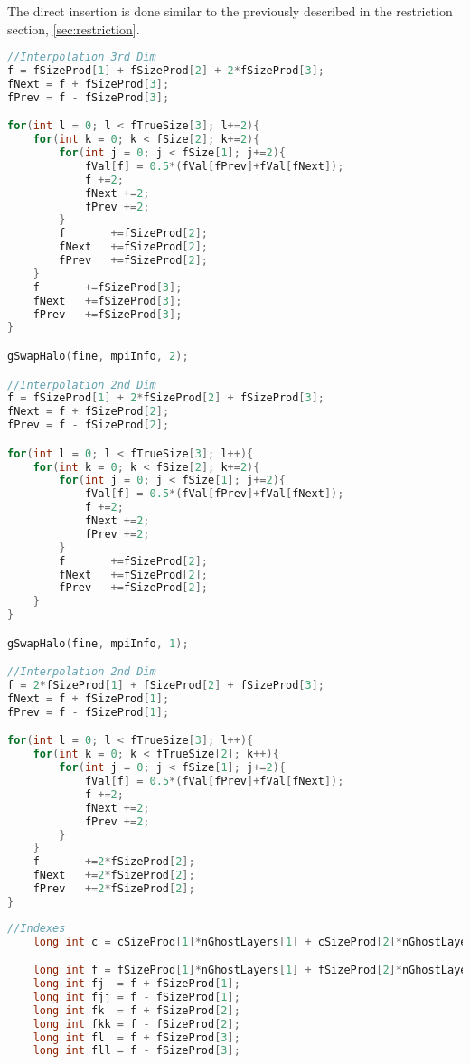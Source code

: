 \newpage
The direct insertion is done similar to the previously described in the restriction section, \ref{sec:restriction}.
\begin{lstlisting}[language=c, caption = Codesnippet for the Z Y and X sweeps]
//Interpolation 3rd Dim
f = fSizeProd[1] + fSizeProd[2] + 2*fSizeProd[3];
fNext = f + fSizeProd[3];
fPrev = f - fSizeProd[3];

for(int l = 0; l < fTrueSize[3]; l+=2){
	for(int k = 0; k < fSize[2]; k+=2){
		for(int j = 0; j < fSize[1]; j+=2){
			fVal[f] = 0.5*(fVal[fPrev]+fVal[fNext]);
			f +=2;
			fNext +=2;
			fPrev +=2;
		}
		f		+=fSizeProd[2];
		fNext 	+=fSizeProd[2];
		fPrev 	+=fSizeProd[2];
	}
	f		+=fSizeProd[3];
	fNext 	+=fSizeProd[3];
	fPrev 	+=fSizeProd[3];
}

gSwapHalo(fine, mpiInfo, 2);

//Interpolation 2nd Dim
f = fSizeProd[1] + 2*fSizeProd[2] + fSizeProd[3];
fNext = f + fSizeProd[2];
fPrev = f - fSizeProd[2];

for(int l = 0; l < fTrueSize[3]; l++){
	for(int k = 0; k < fSize[2]; k+=2){
		for(int j = 0; j < fSize[1]; j+=2){
			fVal[f] = 0.5*(fVal[fPrev]+fVal[fNext]);
			f +=2;
			fNext +=2;
			fPrev +=2;
		}
		f		+=fSizeProd[2];
		fNext 	+=fSizeProd[2];
		fPrev 	+=fSizeProd[2];
	}
}

gSwapHalo(fine, mpiInfo, 1);

//Interpolation 2nd Dim
f = 2*fSizeProd[1] + fSizeProd[2] + fSizeProd[3];
fNext = f + fSizeProd[1];
fPrev = f - fSizeProd[1];

for(int l = 0; l < fTrueSize[3]; l++){
	for(int k = 0; k < fTrueSize[2]; k++){
		for(int j = 0; j < fSize[1]; j+=2){
			fVal[f] = 0.5*(fVal[fPrev]+fVal[fNext]);
			f +=2;
			fNext +=2;
			fPrev +=2;
		}
	}
	f		+=2*fSizeProd[2];
	fNext 	+=2*fSizeProd[2];
	fPrev 	+=2*fSizeProd[2];
}
\end{lstlisting}


\begin{lstlisting}[language=c,  caption = Setting the stencil indexes]
	//Indexes
	long int c = cSizeProd[1]*nGhostLayers[1] + cSizeProd[2]*nGhostLayers[2] + cSizeProd[3]*nGhostLayers[3];

	long int f = fSizeProd[1]*nGhostLayers[1] + fSizeProd[2]*nGhostLayers[2] + fSizeProd[3]*nGhostLayers[3];
	long int fj  = f + fSizeProd[1];
	long int fjj = f - fSizeProd[1];
	long int fk  = f + fSizeProd[2];
	long int fkk = f - fSizeProd[2];
	long int fl  = f + fSizeProd[3];
	long int fll = f - fSizeProd[3];
\end{lstlisting}


